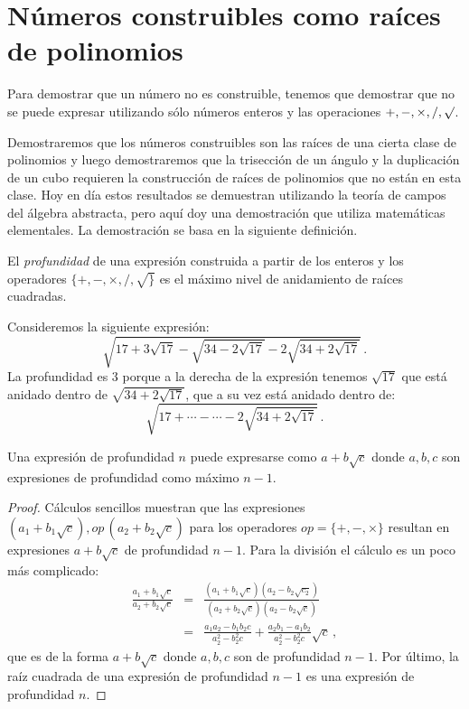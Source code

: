 
\section{Números construibles como raíces de polinomios}\label{s.trisect-poly}

Para demostrar que un número no es construible, tenemos que demostrar que no se puede expresar utilizando sólo números enteros y las operaciones $ {+,-,\times,/,\surd}$.

Demostraremos que los números construibles son las raíces de una cierta clase de polinomios y luego demostraremos que la trisección de un ángulo y la duplicación de un cubo requieren la construcción de raíces de polinomios que no están en esta clase. Hoy en día estos resultados se demuestran utilizando la teoría de campos del álgebra abstracta, pero aquí doy una demostración que utiliza matemáticas elementales. La demostración se basa en la siguiente definición.

\begin{definition}
El \emph{profundidad} de una expresión construida a partir de los enteros y los operadores $\{+,-,\times,/,\surd\}$ es el máximo nivel de anidamiento de raíces cuadradas.
\end{definition}

\begin{example}
Consideremos la siguiente expresión:
\[
\sqrt{17+3\sqrt{17} - \sqrt{34-2\sqrt{17}}
  -2\sqrt{34+2\sqrt{17}} }\,.
\]
La profundidad es $3$ porque a la derecha de la expresión tenemos $\sqrt{17}$ que está anidado dentro de $\sqrt{34+2\sqrt{17}}$, que a su vez está anidado dentro de:
\[
\sqrt{17+\cdots-\cdots-2\sqrt{34+2\sqrt{17}}}\,.
\]
\end{example}

\begin{theorem}
Una expresión de profundidad $n$ puede expresarse como $a+b\sqrt{c}$ donde $a,b,c$ son expresiones de profundidad como máximo $n-1$.
\end{theorem}
\begin{proof}
Cálculos sencillos muestran que las expresiones $(a_1+b_1\sqrt{c}),\mathit{op}\,(a_2+b_2\sqrt{c})$ para los operadores $\mathit{op}=\{+,-,\times\}$ resultan en expresiones $a+b\sqrt{c}$ de profundidad $n-1$. Para la división el cálculo es un poco más complicado:
\begin{eqnarray*}
\frac{a_1+b_1\sqrt{c}}{a_2+b_2\sqrt{c}}&=&
\frac{(a_1+b_1\sqrt{c})(a_2-b_2\sqrt{c_2})}{(a_2+b_2\sqrt{c})(a_2-b_2\sqrt{c})}\\
&=&\frac{a_1a_2-b_1b_2c}{a_2^2-b_2^2c}+\frac{a_2b_1-a_1b_2}{a_2^2-b_2^2c}\sqrt{c}\,,
\end{eqnarray*}
que es de la forma $a+b\sqrt{c}$ donde $a,b,c$ son de profundidad $n-1$.
Por último, la raíz cuadrada de una expresión de profundidad $n-1$ es una expresión de profundidad $n$.
\end{proof}


